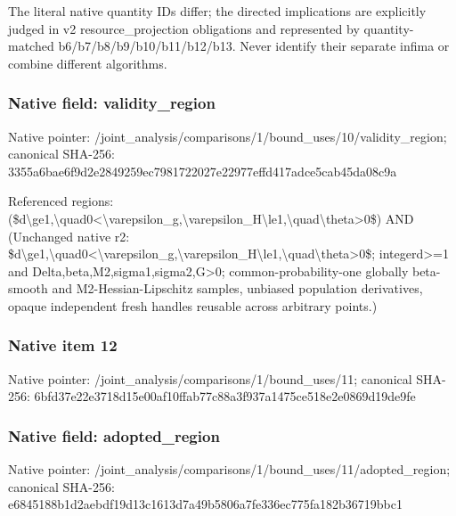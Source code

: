 \documentclass[10pt,a4paper]{article}
\begin{document}
\begingroup\raggedright\sloppy The literal native quantity IDs differ;\allowbreak{} the directed implications are explicitly judged in v2 resource\_\allowbreak{}projection obligations and represented by quantity-matched b6/\allowbreak{}b7/\allowbreak{}b8/\allowbreak{}b9/\allowbreak{}b10/\allowbreak{}b11/\allowbreak{}b12/\allowbreak{}b13. Never identify their separate infima or combine different algorithms.\par\endgroup

\subsubsection{Native field: validity\_\allowbreak{}region}
Native pointer: /joint\_\allowbreak{}analysis/comparisons/1/bound\_\allowbreak{}uses/10/validity\_\allowbreak{}region; canonical SHA-256: 3355a6bae6f9d2e2849259ec7981722027e22977effd417adce5cab45da08c9a

\begingroup\raggedright\sloppy Referenced regions:\allowbreak{} (\$d\textbackslash{}ge1,\allowbreak{}\textbackslash{}quad0<\textbackslash{}varepsilon\_\allowbreak{}g,\allowbreak{}\textbackslash{}varepsilon\_\allowbreak{}H\textbackslash{}le1,\allowbreak{}\textbackslash{}quad\textbackslash{}theta>0\$) AND (Unchanged native r2:\allowbreak{} \$d\textbackslash{}ge1,\allowbreak{}\textbackslash{}quad0<\textbackslash{}varepsilon\_\allowbreak{}g,\allowbreak{}\textbackslash{}varepsilon\_\allowbreak{}H\textbackslash{}le1,\allowbreak{}\textbackslash{}quad\textbackslash{}theta>0\$;\allowbreak{} integerd>=\allowbreak{}1 and Delta,\allowbreak{}beta,\allowbreak{}M2,\allowbreak{}sigma1,\allowbreak{}sigma2,\allowbreak{}G>0;\allowbreak{} common-probability-one globally beta-smooth and M2-Hessian-Lipschitz samples,\allowbreak{} unbiased population derivatives,\allowbreak{} opaque independent fresh handles reusable across arbitrary points.)\par\endgroup

\subsubsection{Native item 12}
Native pointer: /joint\_\allowbreak{}analysis/comparisons/1/bound\_\allowbreak{}uses/11; canonical SHA-256: 6bfd37e22e3718d15e00af10ffab77c88a3f937a1475ce518e2e0869d19de9fe

\subsubsection{Native field: adopted\_\allowbreak{}region}
Native pointer: /joint\_\allowbreak{}analysis/comparisons/1/bound\_\allowbreak{}uses/11/adopted\_\allowbreak{}region; canonical SHA-256: e6845188b1d2aebdf19d13c1613d7a49b5806a7fe336ec775fa182b36719bbc1
\end{document}
